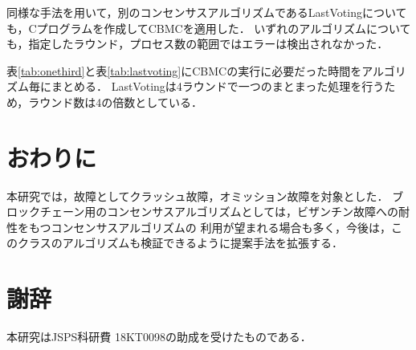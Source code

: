 \documentclass[technicalreport]{ieicej}
\theoremstyle{plain}
\begin{document}
同様な手法を用いて，別のコンセンサスアルゴリズムであるLastVoting\cite{HOjournal}についても，Cプログラムを作成してCBMCを適用した．
いずれのアルゴリズムについても，指定したラウンド，プロセス数の範囲ではエラーは検出されなかった．

表\ref{tab:onethird}と表\ref{tab:lastvoting}にCBMCの実行に必要だった時間をアルゴリズム毎にまとめる．
LastVotingは4ラウンドで一つのまとまった処理を行うため，ラウンド数は4の倍数としている．


\section{おわりに}\label{sec:conclusion}

本研究では，故障としてクラッシュ故障，オミッション故障を対象とした．
ブロックチェーン用のコンセンサスアルゴリズムとしては，ビザンチン故障への耐性をもつコンセンサスアルゴリズムの
利用が望まれる場合も多く，今後は，このクラスのアルゴリズムも検証できるように提案手法を拡張する．

\section*{謝辞}
本研究はJSPS科研費 18KT0098の助成を受けたものである．





\end{document}
